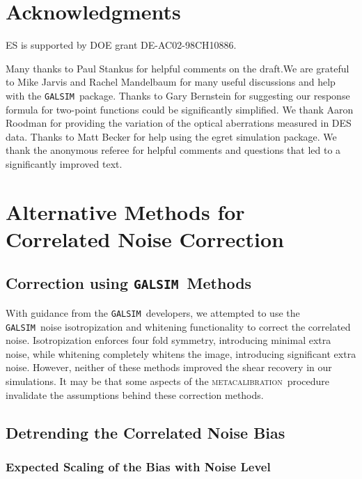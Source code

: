 \documentclass[iop]{emulateapj}
\newcommand{\mcal}{\textsc{metacalibration}}
\newcommand{\galsim}{\texttt{GALSIM}}
\begin{document}
\section*{Acknowledgments}

ES is supported by DOE grant DE-AC02-98CH10886.

Many thanks to Paul Stankus for helpful comments on the draft.We are grateful
to Mike Jarvis and Rachel Mandelbaum for many useful discussions and help with
the \galsim\ package. Thanks to Gary Bernstein for suggesting our response
formula for two-point functions could be significantly simplified.  We thank
Aaron Roodman for providing the variation of the optical aberrations measured
in DES data.  Thanks to Matt Becker for help using the egret simulation
package.  We thank the anonymous referee for helpful comments and questions
that led to a significantly improved text.

\appendix

\section{Alternative Methods for Correlated Noise Correction} \label{sec:altcorr}

\subsection{Correction using \galsim\ Methods}

With guidance from the \galsim\ developers, we attempted to use the \galsim\
noise isotropization and whitening functionality to correct the correlated
noise.  Isotropization enforces four fold symmetry, introducing minimal extra
noise, while whitening completely whitens the image, introducing significant
extra noise.  However, neither of these methods improved the shear recovery in
our simulations.  It may be that some aspects of the \mcal\ procedure
invalidate the assumptions behind these correction methods.


\subsection{Detrending the Correlated Noise Bias} \label{sec:detrend}

\subsubsection{Expected Scaling of the Bias with Noise Level} \label{sec:scaling}
\end{document}
